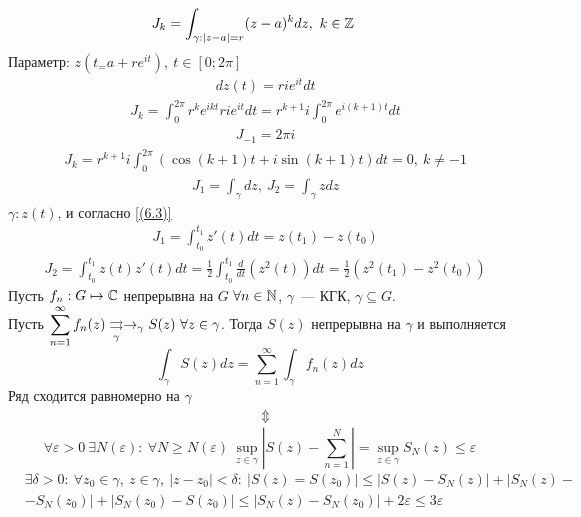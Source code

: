 \example
\begin{align*}
  &J_k = \int_{\gamma: \left| z-a \right| = r} (z-a)^k dz, \ k \in \mathbb{Z}
\end{align*}
Параметр: $z(t_ = a+re^{it}), \ t \in [0;2\pi]$
\begin{align*}
  & dz(t) = rie^{it}dt
\end{align*}
\begin{align*}
  &J_k = \int_{0}^{2\pi} r^ke^{ikt}rie^{it}dt = r^{k+1}i\int_{0}^{2\pi}e^{i(k+1)t} dt
\end{align*}
\begin{align*}
  &J_{-1} = 2 \pi i
\end{align*}
\begin{align*}
  &J_k = r^{k+1}i\int_{0}^{2\pi} \left( \cos(k+1)t + i \sin(k+1)t \right) dt = 0, \ k \neq -1
\end{align*}
\example
\begin{align*}
  &J_1 = \int_{\gamma} dz, \ J_2 = \int_{\gamma}z dz
\end{align*}
$\gamma: z(t)$, и согласно \eqref{(6.3)}
\begin{align*}
  &J_1 = \int_{t_0}^{t_1} z'(t)dt = z(t_1) - z(t_0)
\end{align*}
\begin{align*}
  &J_2 = \int_{t_0}^{t_1} z(t)z'(t)dt = \frac{1}{2}\int_{t_0}^{t_1}\frac{d}{dt}\left( z^2(t) \right)dt = \frac{1}{2}\left( z^2(t_1) - z^2(t_0) \right)
\end{align*}
\theorem
Пусть $f_n: G \mapsto \mathbb{C}$ непрерывна на $G$ $\forall n \in \mathbb{N}$, $\gamma$~---
КГК, $\gamma \subseteq G$.
\\
Пусть $\displaystyle \sum_{n=1}^{\infty}f_n(z) \underset{\gamma}{\rightrightarrows} \rightarrow_{\gamma} S(z)
\ \forall z \in \gamma$.
Тогда $S(z)$ непрерывна на $\gamma$ и выполняется
\begin{equation} \label{(6.7)}
    \int_{\gamma}S(z) dz = \sum_{n=1}^{\infty}\int_{\gamma}f_n(z)dz
\end{equation}
\pr
Ряд сходится равномерно на $\gamma$
\begin{align*}
  & \Updownarrow
\end{align*}
\begin{equation} \label{(6.8)}
    \forall \varepsilon > 0 \ \exists N(\varepsilon): \ \forall N\geq N(\varepsilon) \ \underset{z \in \gamma}{\sup} \left| S(z) - \sum_{n = 1}^{N} \right| = \underset{z \in \gamma}{\sup} S_N(z) \leq \varepsilon
\end{equation}
\begin{align*}
  &\exists \delta > 0: \ \forall z_0 \in \gamma, \ z \in \gamma, \ \left| z - z_0 \right| < \delta: \ \left| S(z) = S(z_0) \right| \leq \left| S(z) - S_N(z) \right| +  \left| S_N(z) - \right. \\
  &\left. - S_N(z_0) \right| + \left| S_N(z_0) - S(z_0) \right| \leq \left| S_N(z) - S_N(z_0) \right| + 2 \varepsilon \leq 3 \varepsilon
\end{align*}
